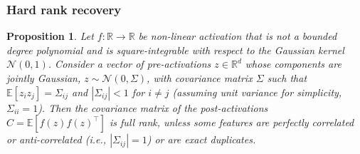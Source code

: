 \documentclass{article}
\newcommand{\R}{\mathbb{R}}
\newcommand{\E}{\mathbb{E}}
\newtheorem{proposition}{Proposition}[section]
\numberwithin{figure}{section}
\begin{document}
\subsubsection*{Hard rank recovery}

\begin{proposition}
\label{prop:rank}
Let $f:\R\to\R$ be non-linear activation that is not a bounded degree polynomial and is square-integrable with respect to the Gaussian kernel $\mathcal{N}(0,1)$. Consider a vector of pre-activations $z\in\R^d$ whose components are jointly Gaussian, $z \sim \mathcal{N}(0, \Sigma)$, with covariance matrix $\Sigma$ such that $\E[z_i z_j]=\Sigma_{ij}$ and $|\Sigma_{ij}|<1$ for $i \neq j$ (assuming unit variance for simplicity, $\Sigma_{ii}=1$). Then the covariance matrix of the post-activations $C = \E[f(z)f(z)^\top]$ is full rank, unless some features are perfectly correlated or anti-correlated (i.e., $|\Sigma_{ij}|=1$) or are exact duplicates.
\end{proposition}
\end{document}
